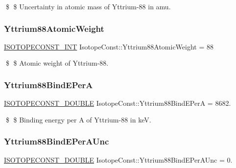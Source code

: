 \$ \$ Uncertainty in atomic mass of Yttrium-\/88 in amu. \mbox{\label{group___isotope_const-_yttrium-_y88_ga7f4c0aed787792dc31cf90692fb7e276}} 
\subsubsection{\texorpdfstring{Yttrium88\+Atomic\+Weight}{Yttrium88AtomicWeight}}
{\footnotesize\ttfamily \mbox{\hyperlink{group___isotope_const-_macros_ga5f18360b3e99483a35c32d789e62621c}{I\+S\+O\+T\+O\+P\+E\+C\+O\+N\+S\+T\+\_\+\+I\+NT}} Isotope\+Const\+::\+Yttrium88\+Atomic\+Weight = 88}

\$ \$ Atomic weight of Yttrium-\/88. \mbox{\label{group___isotope_const-_yttrium-_y88_ga1d9e79514d6cfded85db98ce5de1b86d}} 
\subsubsection{\texorpdfstring{Yttrium88\+Bind\+E\+PerA}{Yttrium88BindEPerA}}
{\footnotesize\ttfamily \mbox{\hyperlink{group___isotope_const-_macros_ga8f45a7272ce02c0b4c65c44636ed719a}{I\+S\+O\+T\+O\+P\+E\+C\+O\+N\+S\+T\+\_\+\+D\+O\+U\+B\+LE}} Isotope\+Const\+::\+Yttrium88\+Bind\+E\+PerA = 8682.}

\$ \$ Binding energy per A of Yttrium-\/88 in keV. \mbox{\label{group___isotope_const-_yttrium-_y88_gae24110fc4194e9bbfa46c33e3ccc2192}} 
\subsubsection{\texorpdfstring{Yttrium88\+Bind\+E\+Per\+A\+Unc}{Yttrium88BindEPerAUnc}}
{\footnotesize\ttfamily \mbox{\hyperlink{group___isotope_const-_macros_ga8f45a7272ce02c0b4c65c44636ed719a}{I\+S\+O\+T\+O\+P\+E\+C\+O\+N\+S\+T\+\_\+\+D\+O\+U\+B\+LE}} Isotope\+Const\+::\+Yttrium88\+Bind\+E\+Per\+A\+Unc = 0.}

